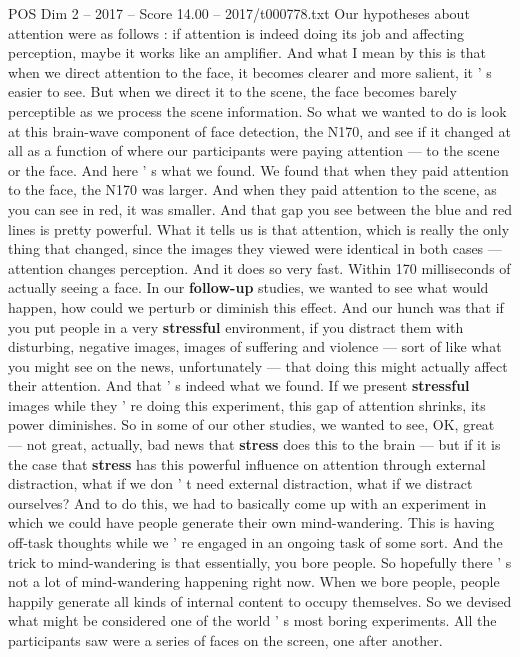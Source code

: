 \begin{textsample}{POS Dim 2 – 2017 – Score 14.00 – 2017/t000778.txt}
Our hypotheses about attention were as follows : if attention is indeed doing its job and affecting perception, maybe it works like an amplifier.
And what I mean by this is that when we direct attention to the face, it becomes clearer and more salient, it ' s easier to see.
But when we direct it to the scene, the face becomes barely perceptible as we process the scene information.
So what we wanted to do is look at this brain-wave component of face detection, the N170, and see if it changed at all as a function of where our participants were paying attention — to the scene or the face.
And here ' s what we found.
We found that when they paid attention to the face, the N170 was larger.
And when they paid attention to the scene, as you can see in red, it was smaller.
And that gap you see between the blue and red lines is pretty powerful.
What it tells us is that attention, which is really the only thing that changed, since the images they viewed were identical in both cases — attention changes perception.
And it does so very fast.
Within 170 milliseconds of actually seeing a face.
In our \textbf{follow-up} studies, we wanted to see what would happen, how could we perturb or diminish this effect.
And our hunch was that if you put people in a very \textbf{stressful} environment, if you distract them with disturbing, negative images, images of suffering and violence — sort of like what you might see on the news, unfortunately — that doing this might actually affect their attention.
And that ' s indeed what we found.
If we present \textbf{stressful} images while they ' re doing this experiment, this gap of attention shrinks, its power diminishes.
So in some of our other studies, we wanted to see, OK, great — not great, actually, bad news that \textbf{stress} does this to the brain — but if it is the case that \textbf{stress} has this powerful influence on attention through external distraction, what if we don ' t need external distraction, what if we distract ourselves?
And to do this, we had to basically come up with an experiment in which we could have people generate their own mind-wandering.
This is having off-task thoughts while we ' re engaged in an ongoing task of some sort.
And the trick to mind-wandering is that essentially, you bore people.
So hopefully there ' s not a lot of mind-wandering happening right now.
When we bore people, people happily generate all kinds of internal content to occupy themselves.
So we devised what might be considered one of the world ' s most boring experiments.
All the participants saw were a series of faces on the screen, one after another.

\end{textsample}

